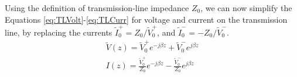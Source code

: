 \documentclass{ximera}
\begin{document}
Using the definition of transmission-line impedance $Z_0$, we can now simplify the Equations \ref{eq:TLVolt}-\ref{eq:TLCurr} for voltage and current on the transmission line, by replacing the currents $\tilde{I}_0^+=Z_0/\tilde{V}_0^+ $, and $\tilde{I}_0^- = -Z_0/\tilde{V}_0^-$.
\begin{eqnarray}
\tilde{V}(z)=\tilde{V}_0^+ e^{-j \beta z} +\tilde{V}_0^- e^{j \beta z} \label{eq:TLIvtl} \\ 
I(z)=\frac{\tilde{V}_0^+}{Z_0} e^{- j \beta z} - \frac{\tilde{V}_0^-}{Z_0} e^{j \beta z}\label{eq:TLIctl}
\end{eqnarray}
 
\end{document}
